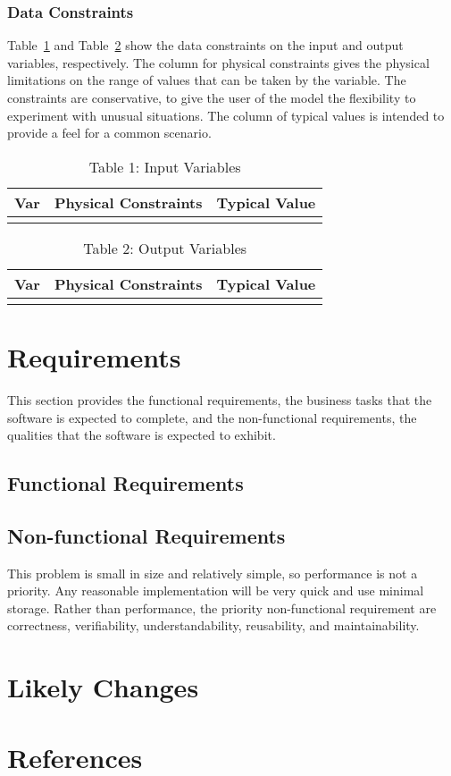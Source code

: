\documentclass[12pt]{article}
\begin{document}
\subsubsection{Data Constraints}
\label{Sec:DataCons}
Table~\ref{Table:Tabl1:InpuVari} and Table~\ref{Table:Tabl2:OutpVari} show the data constraints on the input and output variables, respectively. The column for physical constraints gives the physical limitations on the range of values that can be taken by the variable. The constraints are conservative, to give the user of the model the flexibility to experiment with unusual situations. The column of typical values is intended to provide a feel for a common scenario.
\begin{longtable}{l l l}
\toprule
Var & Physical Constraints & Typical Value
\\
\midrule
\bottomrule
\caption{Table 1: Input Variables}
\label{Table:Tabl1:InpuVari}
\end{longtable}
\begin{longtable}{l l l}
\toprule
Var & Physical Constraints & Typical Value
\\
\midrule
\bottomrule
\caption{Table 2: Output Variables}
\label{Table:Tabl2:OutpVari}
\end{longtable}
\section{Requirements}
\label{Sec:Requ}
This section provides the functional requirements, the business tasks that the software is expected to complete, and the non-functional requirements, the qualities that the software is expected to exhibit.
\subsection{Functional Requirements}
\label{Sec:FuncRequ}
\subsection{Non-functional Requirements}
\label{Sec:Non-Requ}
This problem is small in size and relatively simple, so performance is not a priority. Any reasonable implementation will be very quick and use minimal storage. Rather than performance, the priority non-functional requirement are correctness, verifiability, understandability, reusability, and maintainability.
\section{Likely Changes}
\label{Sec:LikeChan}
\section{References}
\label{Sec:Refe}
\end{document}
